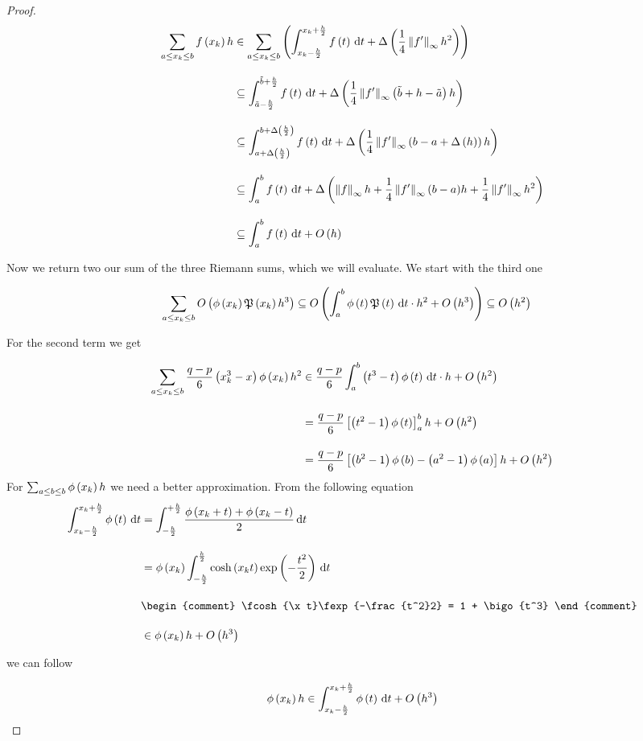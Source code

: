 \begin{proof}
  \begin{align}
    \sum_{a \le \x \le b} \f{\x} h & \in \sum_{a\le \x\le b} \br{\int_{\x-\frac h2}^{\x+\frac h2} \f{t} \d{t} + \bigabs{\frac 14 \snorm{f'} h^2}} \bnl
    & \subseteq \int_{\tilde a - \frac h2}^{\tilde b + \frac h2} \f{t} \d{t} + \bigabs{\frac 14 \snorm{f'}\br{\tilde b + h - \tilde a} h}\bnl
    & \subseteq \int_{a+\bigabs{\frac h2}}^{b+\bigabs{\frac h2}} \f{t} \d{t} + \bigabs{\frac 14\snorm{f'}\br{b-a+\bigabs{h}} h}\bnl
    & \subseteq \int_a^b \f{t} \d{t} + \bigabs{\snorm{f}h + \frac 14 \snorm{f'} (b-a) h + \frac 14 \snorm{f'} h^2} \bnl
    & \subseteq  \int_a^b \f{t} \d{t} + \bigo{h}
  \end{align}

  Now we return two our sum of the three Riemann sums, which we will evaluate. We start with the third one

  \begin{align}
    \sum_{a \le x_{k} \le b} O\left( {\phi\left( {x_{k}} \right) \mathfrak P\left( {x_{k}} \right) h^3} \right) & \subseteq O\left( {\int_a^b \phi\left( {t} \right) \mathfrak P\left( {t} \right) \,\mathrm d{t} \cdot h^2 + O\left( {h^3} \right)} \right) \subseteq O\left( {h^2} \right)
  \end{align}

  \noindent For the second term we get

  \begin{align}
    \sum_{a \le \x \le b} \frac{q-p}6 \br{\x^3 - x} \fphi{\x} h^2 &\in \frac{q-p}6 \int_a^b \br{t^3-t}\fphi{t} \d{t} \cdot h + \bigo{h^2} \bnl
    &= \frac{q-p}6 \left[ \br{t^2-1}\fphi{t} \right]_a^b h + \bigo{h^2} \bnl
    &= \frac{q-p}6 \left[ \br{b^2-1}\fphi{b} - \br{a^2-1}\fphi{a} \right] h + \bigo{h^2}
  \end{align}
  For $\sum_{a\le b\le b} \phi\left( {x_{k}} \right)h$ we need a better approximation. From the following equation
  \begin{align}
    \int_{\x-\frac h2}^{\x+\frac h2} \fphi{t} \d{t} & = \int_{-\frac h2}^{+\frac h2} \frac{\fphi{\x+t}+\fphi{\x-t}}2 \d{t} \bnl
    & = \fphi{\x} \int_{-\frac h2}^{\frac h2} \fcosh{\x t} \fexp{-\frac{t^2}2} \d{t} \bnl
    &
    \begin{comment}
      \fcosh{\x t}\fexp{-\frac{t^2}2} = 1 + \bigo{t^3}
    \end{comment} \bnl
    & \in \fphi{\x} h + \bigo{h^3}
  \end{align}

  \noindent we can follow

  \begin{align}
    \phi\left( {x_{k}} \right) h \in \int_{x_{k}-\frac h2}^{x_{k}+\frac h2} \phi\left( {t} \right) \,\mathrm d{t} + O\left( {h^3} \right)
  \end{align}


\end{proof}
